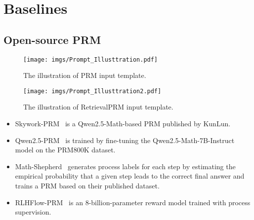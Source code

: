 \section{Baselines}
\label{app:baselines}
\subsection{Open-source PRM}
\begin{figure*}
  \centering
  \texttt{[image: imgs/Prompt\_Illusttration.pdf]}
  \vspace{-20pt}
  \caption{The illustration of PRM input template.}
  \label{fig:prompt template example}
\end{figure*}
\begin{figure*}
  \centering
  \texttt{[image: imgs/Prompt\_Illusttration2.pdf]}
  \vspace{-20pt}
  \caption{The illustration of RetrievalPRM input template.}
  \label{fig:prompt template example2}
\end{figure*}


\begin{itemize}[leftmargin=10pt] 
\item Skywork-PRM~\cite{skyworkopeno12024} is a Qwen2.5-Math-based PRM published by KunLun. 
\item Qwen2.5-PRM~\cite{zheng2024processbench} is trained by fine-tuning the Qwen2.5-Math-7B-Instruct model on the PRM800K dataset. 
\item Math-Shepherd~\cite{wang2024math} generates process labels for each step by estimating the empirical probability that a given step leads to the correct final answer and trains a PRM based on their published dataset. 
\item RLHFlow-PRM~\cite{xiong2024rlhflowmath} is an 8-billion-parameter reward model trained with process supervision. 
\end{itemize}


